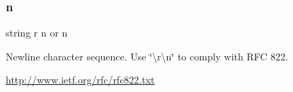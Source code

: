 \mbox{\label{cli_2error__404_8php_a958071ac50ebec838e917de66e151e7e}} 
\subsubsection{\texorpdfstring{n}{n}}
{\footnotesize\ttfamily string r n or n}

Newline character sequence. Use \char`\"{}\textbackslash{}r\textbackslash{}n\char`\"{} to comply with R\+FC 822.

\mbox{\hyperlink{}{http\+://www.\+ietf.\+org/rfc/rfc822.\+txt}}